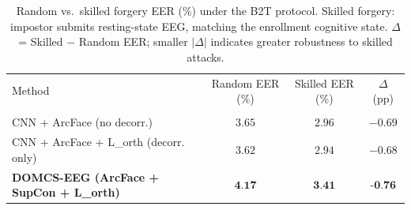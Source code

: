 
\begin{table}[t]
\centering
\caption{Random vs.\ skilled forgery EER (\%) under the B2T protocol.
Skilled forgery: impostor submits resting-state EEG,
matching the enrollment cognitive state.
$\Delta$ = Skilled $-$ Random EER;
smaller $|\Delta|$ indicates greater robustness to skilled attacks.}
\label{tab:forgery}
\begin{tabular}{lccc}
\toprule
Method & Random EER (\%) & Skilled EER (\%) & $\Delta$ (pp) \\\\
\midrule
        CNN + ArcFace (no decorr.) & $3.65$ & $2.96$ & $-0.69$ \\
        CNN + ArcFace + L_orth (decorr. only) & $3.62$ & $2.94$ & $-0.68$ \\
        \textbf{DOMCS-EEG (ArcFace + SupCon + L_orth)} & $\textbf{4.17}$ & $\textbf{3.41}$ & $\textbf{-0.76}$ \\

\bottomrule
\end{tabular}
\end{table}
